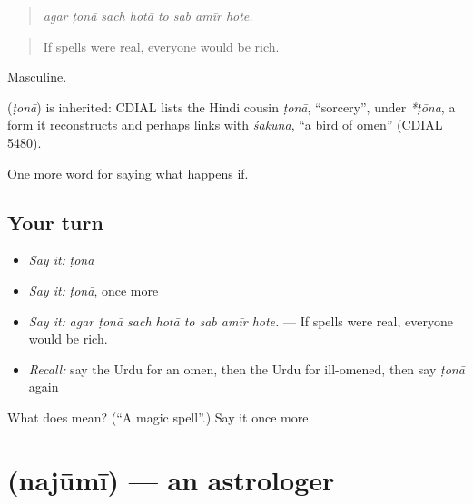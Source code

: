 \begin{quote}
       
\end{quote}

\begin{quote}
\emph{agar ṭonā sach hotā to sab amīr hote.}
\end{quote}

\begin{quote}
If spells were real, everyone would be rich.
\end{quote}

Masculine.

\begin{cousinweb}
\textbf{} (\emph{ṭonā}) is inherited: CDIAL lists the Hindi cousin \emph{ṭonā}, \textquotedblleft{}sorcery\textquotedblright{}, under \emph{*ṭōna}, a form it reconstructs and perhaps links with \emph{śakuna}, \textquotedblleft{}a bird of omen\textquotedblright{} (CDIAL 5480).
\end{cousinweb}

\begin{grammarlens}[title={What you've built}]
One more word for saying what happens if.
\end{grammarlens}

\subsection*{Your turn}
\begin{itemize}
\raggedright
  \item \emph{Say it:} \emph{ṭonā}
  \item \emph{Say it:} \emph{ṭonā}, once more
  \item \emph{Say it:} \emph{agar ṭonā sach hotā to sab amīr hote.} — If spells were real, everyone would be rich.
  \item \emph{Recall:} say the Urdu for an omen, then the Urdu for ill-omened, then say \emph{ṭonā} again
\end{itemize}

\begin{tcolorbox}[breakable,colback=teal!4,colframe=teal!35!black,title={Before you move on}]
What does  mean? (\textquotedblleft{}A magic spell\textquotedblright{}.) Say it once more.
\end{tcolorbox}
\section[\texorpdfstring{\ur{نجومی} (najūmī)}{نجومی (najūmī)}]{ (najūmī) — an astrologer}

